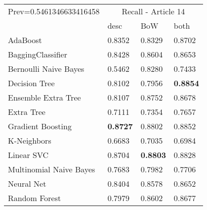 \begin{tabular}{|l|l|l|l| }
\hline
Prev=0.5461346633416458 &  \multicolumn{3}{c|}{Recall - Article 14} \\
\cline{2-4} & desc & BoW & both \\ \hline
AdaBoost                & 0.8352 & 0.8329 & 0.8702\\
BaggingClassifier       & 0.8428 & 0.8604 & 0.8653\\
Bernoulli Naive Bayes   & 0.5462 & 0.8280 & 0.7433\\
Decision Tree           & 0.8102 & 0.7956 & {\bf 0.8854}\\
Ensemble Extra Tree     & 0.8107 & 0.8752 & 0.8678\\
Extra Tree              & 0.7111 & 0.7354 & 0.7657\\
Gradient Boosting       & {\bf 0.8727} & 0.8802 & 0.8852\\
K-Neighbors             & 0.6683 & 0.7035 & 0.6984\\
Linear SVC              & 0.8704 & {\bf 0.8803} & 0.8828\\
Multinomial Naive Bayes & 0.7683 & 0.7982 & 0.7706\\
Neural Net              & 0.8404 & 0.8578 & 0.8652\\
Random Forest           & 0.7979 & 0.8602 & 0.8677\\
\hline
\end{tabular}